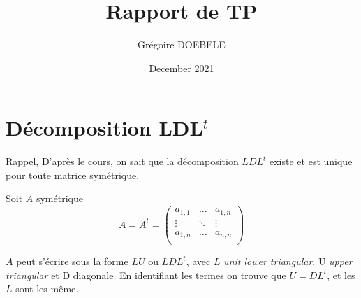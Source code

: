 \documentclass{article}
\title{Rapport de TP}
\author{Grégoire DOEBELE }
\date{December 2021}
\begin{document}
\newcommand{\tikzmark}[1]{\tikz[overlay,remember picture] \node (#1) {};}
\newcommand{\DrawBox}[4][]{%
    \tikz[overlay,remember picture]{%
        \coordinate (TopLeft)     at ($(#2)+(-0.2em,0.9em)$);
        \coordinate (BottomRight) at ($(#3)+(0.2em,-0.3em)$);
        \path (TopLeft); \pgfgetlastxy{\XCoord}{\IgnoreCoord};
        \path (BottomRight); \pgfgetlastxy{\IgnoreCoord}{\YCoord};
        \coordinate (LabelPoint) at ($(\XCoord,\YCoord)!0.5!(BottomRight)$);
        \draw [red,#1] (TopLeft) rectangle (BottomRight);
        \node [below, #1, fill=none, fill opacity=1] at (LabelPoint) {#4};
    }
}


\maketitle

\section{Décomposition LDL\(^t\)}

Rappel,\newline
D'après le cours, on sait que la décomposition \(LDL^t\) existe et est unique pour toute matrice symétrique.

Soit \(A\) symétrique
\[
	A = A^t = 
	\begin{pmatrix}
	a_{1,1}	& \dots	& a_{1,n} 	\\
	\vdots	& \ddots& \vdots	\\
	a_{1,n}	& \dots & a_{n,n} 	\\
	\end{pmatrix}
\]

\(A\) peut s'écrire sous la forme \(LU\) ou \(LDL^t\), avec \(L\) \textit{unit lower triangular}, U \textit{upper triangular} et D diagonale.
En identifiant les termes on trouve que \(U = DL^t\), et les \(L\) sont les même.
\end{document}
